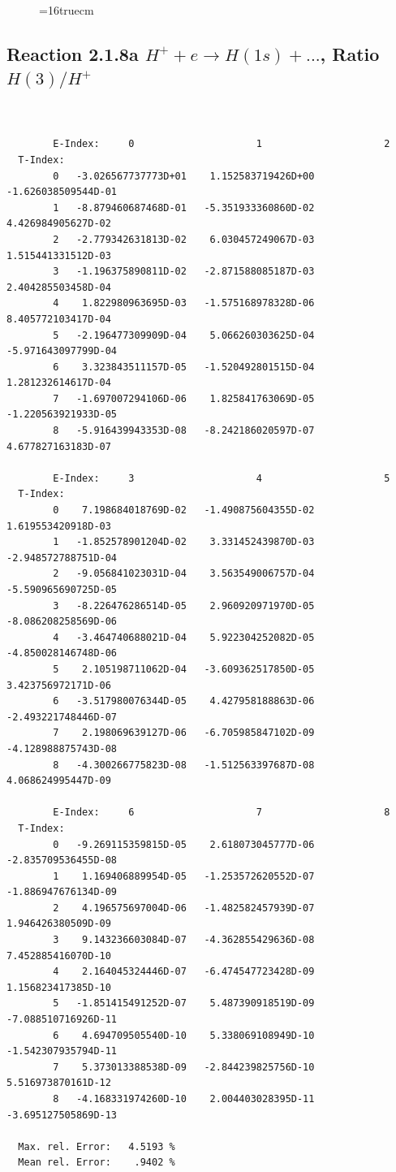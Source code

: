 \documentclass[12pt,dvips]{article}
\begin{document}
\begin{figure} \label{2.1.8_equil}
\epsfxsize=16truecm
\end{figure}
\newpage


\subsection{
Reaction 2.1.8a  $H^+ + e \rightarrow H(1s) + ...$,  Ratio $H(3)/H^+$
}

\begin{small}\begin{verbatim}


        E-Index:     0                     1                     2
  T-Index:
        0   -3.026567737773D+01    1.152583719426D+00   -1.626038509544D-01
        1   -8.879460687468D-01   -5.351933360860D-02    4.426984905627D-02
        2   -2.779342631813D-02    6.030457249067D-03    1.515441331512D-03
        3   -1.196375890811D-02   -2.871588085187D-03    2.404285503458D-04
        4    1.822980963695D-03   -1.575168978328D-06    8.405772103417D-04
        5   -2.196477309909D-04    5.066260303625D-04   -5.971643097799D-04
        6    3.323843511157D-05   -1.520492801515D-04    1.281232614617D-04
        7   -1.697007294106D-06    1.825841763069D-05   -1.220563921933D-05
        8   -5.916439943353D-08   -8.242186020597D-07    4.677827163183D-07

        E-Index:     3                     4                     5
  T-Index:
        0    7.198684018769D-02   -1.490875604355D-02    1.619553420918D-03
        1   -1.852578901204D-02    3.331452439870D-03   -2.948572788751D-04
        2   -9.056841023031D-04    3.563549006757D-04   -5.590965690725D-05
        3   -8.226476286514D-05    2.960920971970D-05   -8.086208258569D-06
        4   -3.464740688021D-04    5.922304252082D-05   -4.850028146748D-06
        5    2.105198711062D-04   -3.609362517850D-05    3.423756972171D-06
        6   -3.517980076344D-05    4.427958188863D-06   -2.493221748446D-07
        7    2.198069639127D-06   -6.705985847102D-09   -4.128988875743D-08
        8   -4.300266775823D-08   -1.512563397687D-08    4.068624995447D-09

        E-Index:     6                     7                     8
  T-Index:
        0   -9.269115359815D-05    2.618073045777D-06   -2.835709536455D-08
        1    1.169406889954D-05   -1.253572620552D-07   -1.886947676134D-09
        2    4.196575697004D-06   -1.482582457939D-07    1.946426380509D-09
        3    9.143236603084D-07   -4.362855429636D-08    7.452885416070D-10
        4    2.164045324446D-07   -6.474547723428D-09    1.156823417385D-10
        5   -1.851415491252D-07    5.487390918519D-09   -7.088510716926D-11
        6    4.694709505540D-10    5.338069108949D-10   -1.542307935794D-11
        7    5.373013388538D-09   -2.844239825756D-10    5.516973870161D-12
        8   -4.168331974260D-10    2.004403028395D-11   -3.695127505869D-13

  Max. rel. Error:   4.5193 %
  Mean rel. Error:    .9402 %

\end{verbatim}\end{small}
\end{document}
